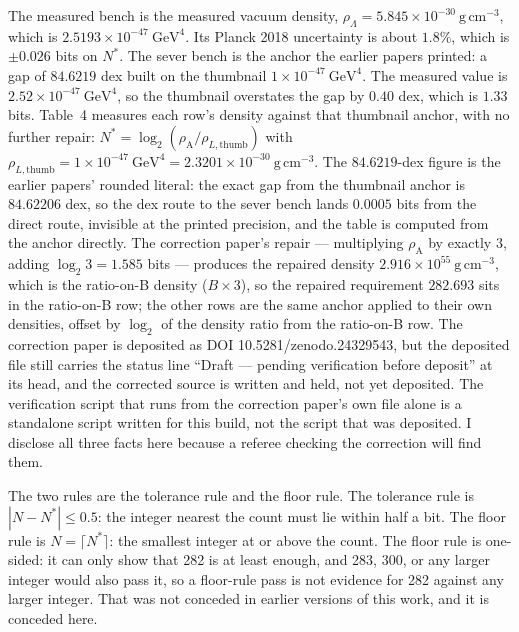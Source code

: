 \documentclass[11pt]{article}
\newcommand{\rhoA}{\rho_{\mathrm{A}}}
\begin{document}
The measured bench is the measured vacuum density,
$\rho_\Lambda = 5.845\times10^{-30}\ \mathrm{g\,cm^{-3}}$, which is
$2.5193\times10^{-47}\ \mathrm{GeV}^4$. Its Planck 2018 uncertainty is
about $1.8\%$, which is $\pm0.026$ bits on $N^*$. The sever bench is
the anchor the earlier papers printed: a gap of $84.6219$ dex built on
the thumbnail $1\times10^{-47}\ \mathrm{GeV}^4$. The measured value is
$2.52\times10^{-47}\ \mathrm{GeV}^4$, so the thumbnail overstates the gap
by $0.40$ dex, which is $1.33$ bits. Table~4 measures each row's density
against that thumbnail anchor, with no further repair:
$N^* = \log_2(\rhoA/\rho_{L,\mathrm{thumb}})$ with
$\rho_{L,\mathrm{thumb}} = 1\times10^{-47}\ \mathrm{GeV}^4 =
2.3201\times10^{-30}\ \mathrm{g\,cm^{-3}}$. The $84.6219$-dex figure is the
earlier papers' rounded literal: the exact gap from the thumbnail anchor
is $84.62206$ dex, so the dex route to the sever bench lands $0.0005$ bits
from the direct route, invisible at the printed precision, and the table
is computed from the anchor directly. The correction paper's repair
--- multiplying $\rhoA$ by exactly $3$, adding $\log_2 3 = 1.585$ bits ---
produces the repaired density $2.916\times10^{55}\ \mathrm{g\,cm^{-3}}$,
which is the ratio-on-B density ($B \times 3$), so the repaired
requirement $282.693$ sits in the ratio-on-B row; the other rows are the
same anchor applied to their own densities, offset by $\log_2$ of the
density ratio from the ratio-on-B row. The correction paper is deposited as
DOI 10.5281/zenodo.24329543, but the deposited file still carries the
status line ``Draft --- pending verification before deposit'' at its
head, and the corrected source is written and held, not yet deposited.
The verification script that runs from the correction paper's own file
alone is a standalone script written for this build, not the script that
was deposited. I disclose all three facts here because a referee
checking the correction will find them.

The two rules are the tolerance rule and the floor rule. The tolerance
rule is $|N - N^*| \le 0.5$: the integer nearest the count must lie
within half a bit. The floor rule is $N = \lceil N^*\rceil$: the
smallest integer at or above the count. The floor rule is one-sided: it
can only show that 282 is at least enough, and 283, 300, or any larger
integer would also pass it, so a floor-rule pass is not evidence for 282
against any larger integer. That was not conceded in earlier versions of
this work, and it is conceded here.
\end{document}
